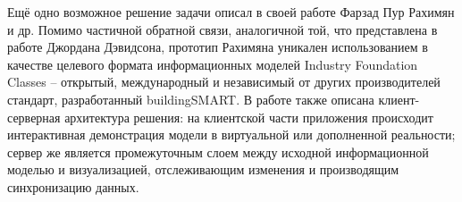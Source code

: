 Ещё одно возможное решение задачи описал в своей работе Фарзад Пур Рахимян и др.%
\cite{PourRahimian2019}
Помимо частичной обратной связи, аналогичной той,
что представлена в работе Джордана Дэвидсона,
прототип Рахимяна уникален использованием в качестве целевого формата информационных моделей
Industry Foundation Classes -- открытый, международный и
независимый от других производителей стандарт,
разработанный buildingSMART.%
\cite{BuildingSmartIFC}
В работе также описана клиент-серверная архитектура решения:
на клиентской части приложения происходит интерактивная демонстрация модели
в виртуальной или дополненной реальности;
сервер же является промежуточным слоем между исходной информационной моделью и визуализацией,
отслеживающим изменения и производящим синхронизацию данных.